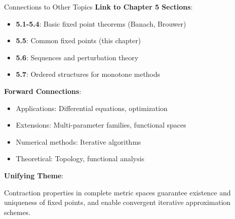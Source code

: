 \documentclass[aspectratio=169,10pt]{beamer}
\begin{document}
\begin{frame}{Connections to Other Topics}
    \textbf{Link to Chapter 5 Sections}:
    \begin{itemize}
        \item \textbf{5.1-5.4}: Basic fixed point theorems (Banach, Brouwer)
        \item \textbf{5.5}: Common fixed points (this chapter)
        \item \textbf{5.6}: Sequences and perturbation theory
        \item \textbf{5.7}: Ordered structures for monotone methods
    \end{itemize}

    \medskip

    \textbf{Forward Connections}:
    \begin{itemize}
        \item Applications: Differential equations, optimization
        \item Extensions: Multi-parameter families, functional spaces
        \item Numerical methods: Iterative algorithms
        \item Theoretical: Topology, functional analysis
    \end{itemize}

    \medskip

    \textbf{Unifying Theme}:

    \alert{Contraction properties in complete metric spaces guarantee existence and uniqueness of fixed points, and enable convergent iterative approximation schemes.}
\end{frame}
\end{document}
